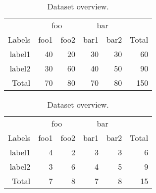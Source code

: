 \begin{table}[ht]
  \caption{Dataset overview.}
  \begin{subtable}{\linewidth}
    \centering
    \begin{tabular}{rrrrrr}
      \toprule
      &\multicolumn{ 2 }{c}{ foo }&\multicolumn{ 2 }{c}{ bar }&\\
      \cmidrule(lr){ 2-3 }\cmidrule(lr){ 4-5 }
      Labels
        & foo1& foo2& bar1& bar2
        & Total\\
      \midrule
      label1
        & 40& 20& 30& 30
        & 60\\
      label2
        & 30& 60& 40& 50
        & 90\\
      \addlinespace
      Total
        & 70& 80& 70& 80
        & 150\\
      \bottomrule
    \end{tabular}
  \end{subtable}
  \par\bigskip
  \begin{subtable}{\linewidth}
    \centering
    \begin{tabular}{rrrrrr}
      \toprule
      &\multicolumn{ 2 }{c}{ foo }&\multicolumn{ 2 }{c}{ bar }&\\
      \cmidrule(lr){ 2-3 }\cmidrule(lr){ 4-5 }
      Labels
        & foo1& foo2& bar1& bar2
        & Total\\
      \midrule
      label1
        & 4& 2& 3& 3
        & 6\\
      label2
        & 3& 6& 4& 5
        & 9\\
      \addlinespace
      Total
        & 7& 8& 7& 8
        & 15\\
      \bottomrule
    \end{tabular}
  \end{subtable}
  \par\bigskip
\end{table}
